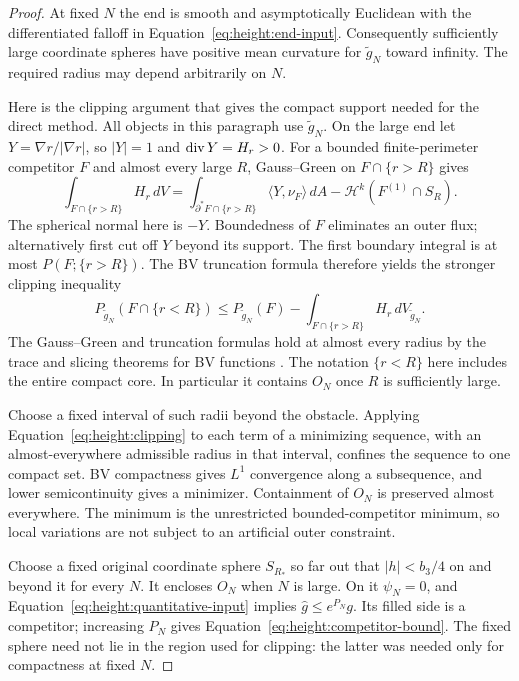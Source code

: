 \begin{proof}
At fixed $N$ the end is smooth and asymptotically Euclidean with the
differentiated falloff in Equation~\eqref{eq:height:end-input}.
Consequently sufficiently large coordinate spheres have positive
mean curvature for $\widetilde g_N$ toward infinity.
The required radius may depend arbitrarily on $N$.

Here is the clipping argument that gives the compact support needed
for the direct method.  All objects in this paragraph use
$\widetilde g_N$.  On the large end let
$Y=\nabla r/|\nabla r|$, so $|Y|=1$ and
$\operatorname{div} Y=H_r>0$.  For a bounded finite-perimeter competitor $F$ and
almost every large $R$, Gauss--Green on $F\cap\{r>R\}$ gives
\[
 \int_{F\cap\{r>R\}}H_r\,dV
 =\int_{\partial^*F\cap\{r>R\}}\langle Y,\nu_F\rangle\,dA
 -\mathcal H^k(F^{(1)}\cap S_R).
\]
The spherical normal here is $-Y$.  Boundedness of $F$ eliminates an
outer flux; alternatively first cut off $Y$ beyond its support.  The
first boundary integral is at most $P(F;\{r>R\})$.  The BV
truncation formula therefore yields the stronger clipping inequality
\begin{equation}\label{eq:height:clipping}
 P_{\widetilde g_N}(F\cap\{r<R\})
 \le P_{\widetilde g_N}(F)
 -\int_{F\cap\{r>R\}}H_r\,dV_{\widetilde g_N}.
\end{equation}
The Gauss--Green and truncation formulas hold at almost every radius
by the trace and slicing theorems for BV functions \cite{AFP}.
The notation $\{r<R\}$ here includes the entire compact
core.  In particular it contains $O_N$ once $R$ is sufficiently large.

Choose a fixed interval of such radii beyond the obstacle.  Applying
Equation~\eqref{eq:height:clipping} to each term of a minimizing
sequence, with an almost-everywhere admissible radius in that interval,
confines the sequence to one compact set.  BV compactness gives
$L^1$ convergence along a subsequence, and lower semicontinuity gives
a minimizer.  Containment of $O_N$ is preserved almost everywhere.
The minimum is the unrestricted bounded-competitor minimum, so local
variations are not subject to an artificial outer constraint.

Choose a fixed original coordinate sphere $S_{R_*}$ so far out that
$|h|<b_3/4$ on and beyond it for every $N$.  It encloses $O_N$ when
$N$ is large.  On it $\psi_N=0$, and
Equation~\eqref{eq:height:quantitative-input} implies
$\widehat g\le e^{P_N}g$.  Its filled side is a competitor; increasing
$P_N$ gives Equation~\eqref{eq:height:competitor-bound}.  The fixed
sphere need not lie in the region used for clipping: the latter was
needed only for compactness at fixed $N$.


\end{proof}
